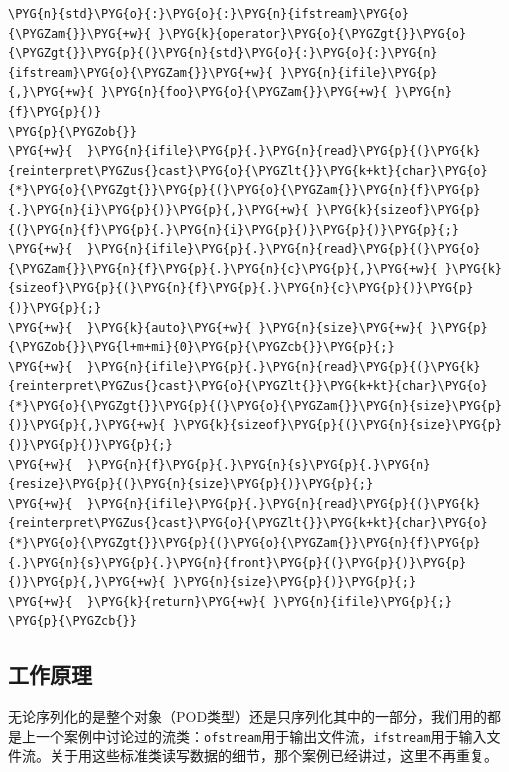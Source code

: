 \begin{codeblockbg}
\begin{Verbatim}[commandchars=\\\{\},breaklines=true,breakanywhere=true,fontsize=\codefont,xleftmargin=17bp]
\PYG{n}{std}\PYG{o}{:}\PYG{o}{:}\PYG{n}{ifstream}\PYG{o}{\PYGZam{}}\PYG{+w}{ }\PYG{k}{operator}\PYG{o}{\PYGZgt{}}\PYG{o}{\PYGZgt{}}\PYG{p}{(}\PYG{n}{std}\PYG{o}{:}\PYG{o}{:}\PYG{n}{ifstream}\PYG{o}{\PYGZam{}}\PYG{+w}{ }\PYG{n}{ifile}\PYG{p}{,}\PYG{+w}{ }\PYG{n}{foo}\PYG{o}{\PYGZam{}}\PYG{+w}{ }\PYG{n}{f}\PYG{p}{)}
\PYG{p}{\PYGZob{}}
\PYG{+w}{  }\PYG{n}{ifile}\PYG{p}{.}\PYG{n}{read}\PYG{p}{(}\PYG{k}{reinterpret\PYGZus{}cast}\PYG{o}{\PYGZlt{}}\PYG{k+kt}{char}\PYG{o}{*}\PYG{o}{\PYGZgt{}}\PYG{p}{(}\PYG{o}{\PYGZam{}}\PYG{n}{f}\PYG{p}{.}\PYG{n}{i}\PYG{p}{)}\PYG{p}{,}\PYG{+w}{ }\PYG{k}{sizeof}\PYG{p}{(}\PYG{n}{f}\PYG{p}{.}\PYG{n}{i}\PYG{p}{)}\PYG{p}{)}\PYG{p}{;}
\PYG{+w}{  }\PYG{n}{ifile}\PYG{p}{.}\PYG{n}{read}\PYG{p}{(}\PYG{o}{\PYGZam{}}\PYG{n}{f}\PYG{p}{.}\PYG{n}{c}\PYG{p}{,}\PYG{+w}{ }\PYG{k}{sizeof}\PYG{p}{(}\PYG{n}{f}\PYG{p}{.}\PYG{n}{c}\PYG{p}{)}\PYG{p}{)}\PYG{p}{;}
\PYG{+w}{  }\PYG{k}{auto}\PYG{+w}{ }\PYG{n}{size}\PYG{+w}{ }\PYG{p}{\PYGZob{}}\PYG{l+m+mi}{0}\PYG{p}{\PYGZcb{}}\PYG{p}{;}
\PYG{+w}{  }\PYG{n}{ifile}\PYG{p}{.}\PYG{n}{read}\PYG{p}{(}\PYG{k}{reinterpret\PYGZus{}cast}\PYG{o}{\PYGZlt{}}\PYG{k+kt}{char}\PYG{o}{*}\PYG{o}{\PYGZgt{}}\PYG{p}{(}\PYG{o}{\PYGZam{}}\PYG{n}{size}\PYG{p}{)}\PYG{p}{,}\PYG{+w}{ }\PYG{k}{sizeof}\PYG{p}{(}\PYG{n}{size}\PYG{p}{)}\PYG{p}{)}\PYG{p}{;}
\PYG{+w}{  }\PYG{n}{f}\PYG{p}{.}\PYG{n}{s}\PYG{p}{.}\PYG{n}{resize}\PYG{p}{(}\PYG{n}{size}\PYG{p}{)}\PYG{p}{;}
\PYG{+w}{  }\PYG{n}{ifile}\PYG{p}{.}\PYG{n}{read}\PYG{p}{(}\PYG{k}{reinterpret\PYGZus{}cast}\PYG{o}{\PYGZlt{}}\PYG{k+kt}{char}\PYG{o}{*}\PYG{o}{\PYGZgt{}}\PYG{p}{(}\PYG{o}{\PYGZam{}}\PYG{n}{f}\PYG{p}{.}\PYG{n}{s}\PYG{p}{.}\PYG{n}{front}\PYG{p}{(}\PYG{p}{)}\PYG{p}{)}\PYG{p}{,}\PYG{+w}{ }\PYG{n}{size}\PYG{p}{)}\PYG{p}{;}
\PYG{+w}{  }\PYG{k}{return}\PYG{+w}{ }\PYG{n}{ifile}\PYG{p}{;}
\PYG{p}{\PYGZcb{}}
\end{Verbatim}
\end{codeblockbg}



\subsection{工作原理}



无论序列化的是整个对象（POD类型）还是只序列化其中的一部分，我们用的都是上一个案例中讨论过的流类：\texttt{ofstream}用于输出文件流，\texttt{ifstream}用于输入文件流。关于用这些标准类读写数据的细节，那个案例已经讲过，这里不再重复。


